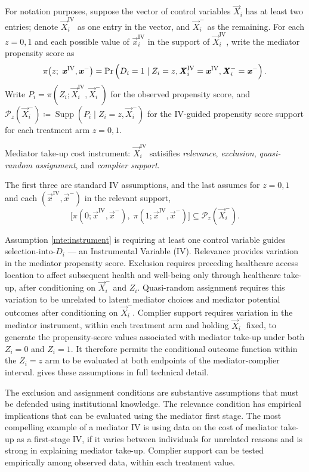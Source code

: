 For notation purposes, suppose the vector of control variables $\vec X_i$ has at least two entries;
denote $\vec X_i^{\text{IV}}$ as one entry in the vector, and $\vec X_i^-$ as the remaining.
For each $z = 0,1$ and each possible value of $\vec x_i^{\mathrm{IV}}$ in the support of $\vec X_i^{\mathrm{IV}}$, write the mediator propensity score as
\[ \pi\big( z; \;\boldsymbol{\mathit{x}}^{\mathrm{IV}}, \boldsymbol{\mathit{x}}^- \big) = \Pr\left( D_i=1 \mid Z_i=z, \boldsymbol{\mathit{X}}_i^{\mathrm{IV}}=\boldsymbol{\mathit{x}}^{\mathrm{IV}}, \boldsymbol{\mathit{X}}_i^-=\boldsymbol{\mathit{x}}^- \right). \]
Write $P_i = \pi(Z_i; \vec X_i^{\mathrm{IV}}, \vec X_i^-)$ for the observed propensity score, and
$\mathcal P_{z} \left(\vec X_i^- \right) \coloneqq \operatorname{Supp}\left( P_i \mid Z_i = z,\vec X_i^- \right)$ for the IV-guided propensity score support for each treatment arm $z=0,1$.
\begin{assumptionMTE}
    \label{mte:instrument}
    Mediator take-up cost instrument: $\vec X_i^{\mathrm{IV}}$ satisifies \emph{relevance}, \emph{exclusion}, \emph{quasi-random assignment}, and \emph{complier support}.
    
    The first three are standard IV assumptions, and the last assumes for $z=0,1$ and each $(\vec x^{\mathrm{IV}},\vec x^-)$ in the relevant support,
    \[ \Big[
        \pi(0;\vec x^{\mathrm{IV}},\vec x^-), \; \pi(1;\vec x^{\mathrm{IV}},\vec x^-) \Big]
    \subseteq \mathcal P_{z} \left(\vec X_i^- \right) . \]
\end{assumptionMTE}
Assumption \ref{mte:instrument} is requiring at least one control variable guides selection-into-$D_i$ --- an Instrumental Variable (IV).
Relevance provides variation in the mediator propensity score.
Exclusion requires preceding healthcare access location to affect subsequent health and well-being only through healthcare take-up, after conditioning on $\vec X_i^-$ and $Z_i$.
Quasi-random assignment requires this variation to be unrelated to latent mediator choices and mediator potential outcomes after conditioning on $\vec X_i^-$.
Complier support requires variation in the mediator instrument, within each treatment arm and holding $\vec X_i^-$ fixed, to generate the propensity-score values associated with mediator take-up under both $Z_i=0$ and $Z_i=1$.
It therefore permits the conditional outcome function within the $Z_i=z$ arm to be evaluated at both endpoints of the mediator-complier interval.
 gives these assumptions in full technical detail.

The exclusion and assignment conditions are substantive assumptions that must be defended using institutional knowledge.
The relevance condition has empirical implications that can be evaluated using the mediator first stage.
The most compelling example of a mediator IV is using data on the cost of mediator take-up as a first-stage IV, if it varies between individuals for unrelated reasons and is strong in explaining mediator take-up.
Complier support can be tested empirically among observed data, within each treatment value. 

